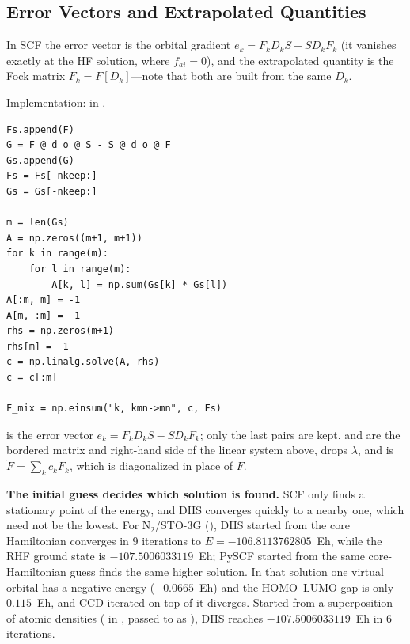 \subsection{Error Vectors and Extrapolated Quantities}

In SCF the error vector is the orbital gradient $e_k = F_k D_k S - S D_k F_k$ (it vanishes exactly at the HF solution, where $f_{ai} = 0$), and the extrapolated quantity is the Fock matrix $F_k = F[D_k]$---note that both are built from the same $D_k$.

Implementation:  in .

\begin{codemap}
\begin{lstlisting}[frame=none, numbers=none, xleftmargin=0pt, backgroundcolor={}]
Fs.append(F)
G = F @ d_o @ S - S @ d_o @ F
Gs.append(G)
Fs = Fs[-nkeep:]
Gs = Gs[-nkeep:]

m = len(Gs)
A = np.zeros((m+1, m+1))
for k in range(m):
    for l in range(m):
        A[k, l] = np.sum(Gs[k] * Gs[l])
A[:m, m] = -1
A[m, :m] = -1
rhs = np.zeros(m+1)
rhs[m] = -1
c = np.linalg.solve(A, rhs)
c = c[:m]

F_mix = np.einsum("k, kmn->mn", c, Fs)
\end{lstlisting}
 is the error vector $e_k = F_k D_k S - S D_k F_k$; only the last  pairs are kept.  and  are the bordered matrix and right-hand side of the linear system above,  drops $\lambda$, and  is $\tilde{F} = \sum_k c_k F_k$, which is diagonalized in place of $F$.
\end{codemap}

\begin{pitfall}
\textbf{The initial guess decides which solution is found.} SCF only finds a stationary point of the energy, and DIIS converges quickly to a nearby one, which need not be the lowest. For N$_2$/STO-3G (), DIIS started from the core Hamiltonian converges in 9 iterations to $E = -106.8113762805$~Eh, while the RHF ground state is $-107.5006033119$~Eh; PySCF started from the same core-Hamiltonian guess finds the same higher solution. In that solution one virtual orbital has a negative energy ($-0.0665$~Eh) and the HOMO--LUMO gap is only $0.115$~Eh, and CCD iterated on top of it diverges. Started from a superposition of atomic densities ( in , passed to  as ), DIIS reaches $-107.5006033119$~Eh in 6 iterations.
\end{pitfall}

